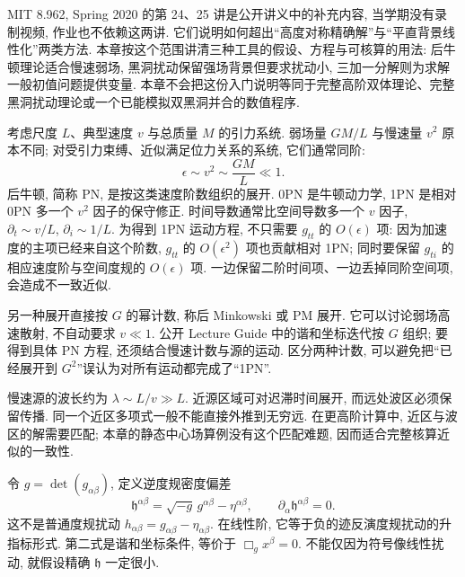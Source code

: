 \label{ch:gr-advanced}

MIT 8.962, Spring 2020 的第 24、25 讲是公开讲义中的补充内容, 当学期没有录制视频, 作业也不依赖这两讲. 它们说明如何超出“高度对称精确解”与“平直背景线性化”两类方法. 本章按这个范围讲清三种工具的假设、方程与可核算的用法: 后牛顿理论适合慢速弱场, 黑洞扰动保留强场背景但要求扰动小, 三加一分解则为求解一般初值问题提供变量. 本章不会把这份入门说明等同于完整高阶双体理论、完整黑洞扰动理论或一个已能模拟双黑洞并合的数值程序.


考虑尺度 $L$、典型速度 $v$ 与总质量 $M$ 的引力系统. 弱场量 $GM/L$ 与慢速量 $v^2$ 原本不同; 对受引力束缚、近似满足位力关系的系统, 它们通常同阶:
\begin{equation}
 \epsilon\sim v^2\sim\frac{GM}L\ll1.
 \label{eq:gr-pn-order}
\end{equation}
后牛顿, 简称 PN, 是按这类速度阶数组织的展开. 0PN 是牛顿动力学, 1PN 是相对 0PN 多一个 $v^2$ 因子的保守修正. 时间导数通常比空间导数多一个 $v$ 因子, $\partial_t\sim v/L$, $\partial_i\sim1/L$. 为得到 1PN 运动方程, 不只需要 $g_{tt}$ 的 $O(\epsilon)$ 项: 因为加速度的主项已经来自这个阶数, $g_{tt}$ 的 $O(\epsilon^2)$ 项也贡献相对 1PN; 同时要保留 $g_{ti}$ 的相应速度阶与空间度规的 $O(\epsilon)$ 项. 一边保留二阶时间项、一边丢掉同阶空间项, 会造成不一致近似.

另一种展开直接按 $G$ 的幂计数, 称后 Minkowski 或 PM 展开. 它可以讨论弱场高速散射, 不自动要求 $v\ll1$. 公开 Lecture Guide 中的谐和坐标迭代按 $G$ 组织; 要得到具体 PN 方程, 还须结合慢速计数与源的运动. 区分两种计数, 可以避免把“已经展开到 $G^2$”误认为对所有运动都完成了“1PN”.

慢速源的波长约为 $\lambda\sim L/v\gg L$. 近源区域可对迟滞时间展开, 而远处波区必须保留传播. 同一个近区多项式一般不能直接外推到无穷远. 在更高阶计算中, 近区与波区的解需要匹配; 本章的静态中心场算例没有这个匹配难题, 因而适合完整核算近似的一致性.


令 $g=\det(g_{\alpha\beta})$, 定义逆度规密度偏差
\begin{equation}
 \mathfrak h^{\alpha\beta}=\sqrt{-g}\,g^{\alpha\beta}-\eta^{\alpha\beta},
 \qquad \partial_\alpha\mathfrak h^{\alpha\beta}=0.
 \label{eq:gr-gothic}
\end{equation}
这不是普通度规扰动 $h_{\alpha\beta}=g_{\alpha\beta}-\eta_{\alpha\beta}$. 在线性阶, 它等于负的迹反演度规扰动的升指标形式. 第二式是谐和坐标条件, 等价于 $\Box_g x^\beta=0$. 不能仅因为符号像线性扰动, 就假设精确 $\mathfrak h$ 一定很小.

